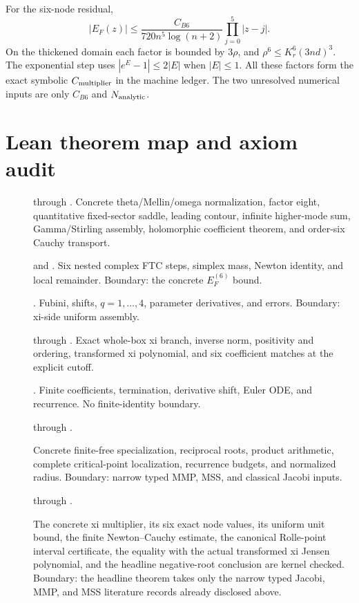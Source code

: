 \documentclass[10pt]{article}
\begin{document}
For the six-node residual,
\[
 |E_F(z)|\le\frac{C_{B6}}{720n^5\log(n+2)}
 \prod_{j=0}^{5}|z-j|.
\]
On the thickened domain each factor is bounded by $3\rho$, and
$\rho^6\le K_r^6(3nd)^3$.  The exponential step uses
$|e^E-1|\le2|E|$ when $|E|\le1$.  All these factors form the exact symbolic
$C_{\rm multiplier}$ in the machine ledger.  The two unresolved numerical
inputs are only $C_{B6}$ and $N_{\rm analytic}$.

\section{Lean theorem map and axiom audit}\label{sup:lean}

\begin{description}
\item[] through .
Concrete theta/Mellin/omega normalization, factor eight, quantitative
fixed-sector saddle, leading contour, infinite higher-mode sum, Gamma/Stirling
assembly, holomorphic coefficient theorem, and order-six Cauchy transport.
\item[] and
.
Six nested complex FTC steps, simplex mass, Newton identity, and local
remainder. Boundary: the concrete $E_F^{(6)}$ bound.
\item[]. Fubini, shifts, $q=1,\ldots,4$,
parameter derivatives, and errors. Boundary: xi-side uniform assembly.
\item[] through .
Exact whole-box xi branch, inverse norm, positivity and ordering, transformed
xi polynomial, and six coefficient matches at the explicit cutoff.
\item[]. Finite coefficients, termination,
derivative shift, Euler ODE, and recurrence. No finite-identity boundary.
\item[] through
.\par
Concrete finite-free specialization, reciprocal roots, product arithmetic,
complete critical-point localization, recurrence budgets, and normalized
radius. Boundary: narrow typed MMP, MSS, and classical Jacobi inputs.
\item[] through
.\par
The concrete xi multiplier, its six exact node values, its uniform unit
bound, the finite Newton--Cauchy estimate, the canonical Rolle-point
interval certificate, the equality with the actual transformed xi Jensen
polynomial, and the headline negative-root conclusion are kernel checked.
Boundary: the headline theorem takes only the narrow typed Jacobi, MMP, and
MSS literature records already disclosed above.
\end{description}
\end{document}
